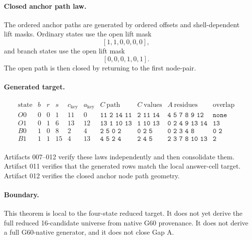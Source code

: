 \paragraph{Closed anchor path law.}
The ordered anchor paths are generated by ordered offsets and shell-dependent lift masks.  Ordinary states use the open lift mask
\[
    [1,1,0,0,0,0],
\]
and branch states use the open lift mask
\[
    [0,0,0,1,0,1].
\]
The open path is then closed by returning to the first node-pair.

\paragraph{Generated target.}
\[
\begin{array}{c|c|c|c|c|c|c|c|c|c}
\mathrm{state} & b & r & s & c_{\mathrm{key}} & a_{\mathrm{key}} & C\ \mathrm{path} & C\ \mathrm{values} & A\ \mathrm{residues} & \mathrm{overlap}\\
\hline
O0 & 0 & 0 & 1 & 11 & 0 & \texttt{11 2 14 11} & \texttt{2 11 14} & \texttt{4 5 7 8 9 12} & \texttt{none} \\
O1 & 0 & 1 & 6 & 13 & 12 & \texttt{13 1 10 13} & \texttt{1 10 13} & \texttt{0 2 4 9 13 14} & \texttt{13} \\
B0 & 1 & 0 & 8 & 2 & 4 & \texttt{2 5 0 2} & \texttt{0 2 5} & \texttt{0 2 3 4 8} & \texttt{0 2} \\
B1 & 1 & 1 & 15 & 4 & 13 & \texttt{4 5 2 4} & \texttt{2 4 5} & \texttt{2 3 7 8 10 13} & \texttt{2} \\
\end{array}
\]

Artifacts 007--012 verify these laws independently and then consolidate them.  Artifact 011 verifies that the generated rows match the local answer-cell target.  Artifact 012 verifies the closed anchor node path geometry.

\paragraph{Boundary.}
This theorem is local to the four-state reduced target.  It does not yet derive the full reduced 16-candidate universe from native G60 provenance.  It does not derive a full G60-native generator, and it does not close Gap A.
